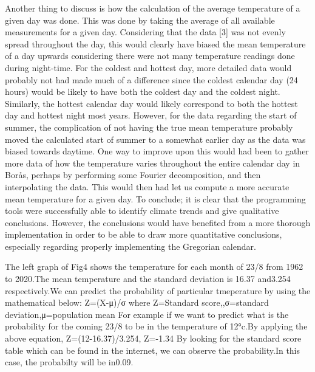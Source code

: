 \documentclass[a4, 12pt]{article}
\begin{document}
\indent Another thing to discuss is how the calculation of the average temperature of a given day was done. This was done by taking the average of all available measurements for a given day. Considering that the data [3] was not evenly spread throughout the day, this would clearly have biased the mean temperature of a day upwards considering there were not many temperature readings done during night-time. For the coldest and hottest day, more detailed data would probably not had made much of a difference since the coldest calendar day (24 hours) would be likely to have both the coldest day and the coldest night. Similarly, the hottest calendar day would likely correspond to both the hottest day and hottest night most years. However, for the data regarding the start of summer, the complication of not having the true mean temperature probably moved the calculated start of summer to a somewhat earlier day as the data was biased towards daytime. One way to improve upon this would had been to gather more data of how the temperature varies throughout the entire calendar day in Borås, perhaps by performing some Fourier decomposition, and then interpolating the data. This would then had let us compute a more accurate mean temperature for a given day. \newline
\indent To conclude; it is clear that the programming tools were successfully able to identify climate trends and give qualitative conclusions. However, the conclusions would have benefited from a more thorough implementation in order to be able to draw more quantitative conclusions, especially regarding properly implementing the Gregorian calendar.

 \newline
\indent
The left graph of Fig4 shows the temperature for each month of 23/8 from 1962 to 2020.The mean temperature and the standard deviation is 16.37 and3.254 respectively.We can predict the probability of particular tmeperature by using the mathematical below:\newline\indent
Z=(X-μ)/σ where Z=Standard score,,σ=standard deviation,μ=population mean\newline\indent
For example if we want to predict what is the probability for the coming 23/8 to be in the temperature of 12°c.By applying the above equation,\newline\indent
Z=(12-16.37)/3.254,
Z=-1.34 \newline\indent
By looking for the standard score table which can be found in the internet, we can observe the probability.In this case, the probabilty will be in0.09.\newline\indent
\end{document}
